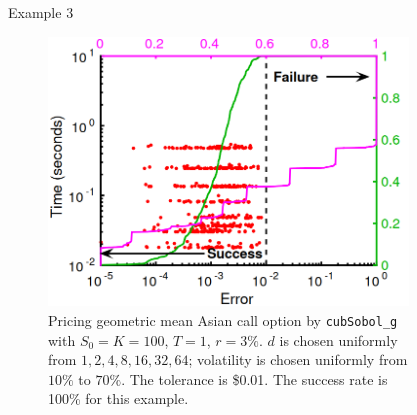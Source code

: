 \documentclass[final]{beamer}
\newlength{\sepwid}
\newlength{\onecolwid}
\newlength{\twocolwid}
\begin{document}
\begin{frame}[t]
\begin{columns}[t]
\begin{column}{\twocolwid}
\begin{column}{\twocolwid}
\begin{columns}[t,totalwidth=\twocolwid]
\begin{column}{\onecolwid}
\end{column} %
\begin{column}{\sepwid}\end{column}
\begin{column}{\onecolwid} %


\begin{block}{\vspace{-11mm}Example 3}

\begin{figure}
	\centering
	\includegraphics[width=1\linewidth]{cubSobol.png}
	\caption[cubSobol]{Pricing geometric mean Asian call option by \texttt{cubSobol\_g} with $S_0=K=100$, $T=1$, $r=3\%$. $d$ is chosen uniformly from $1, 2, 4, 8, 16, 32, 64$; volatility is chosen uniformly from $10\%$ to $70\%$. The tolerance is \$0.01. The success rate is 100\% for this example.}
	\label{fig:cubSobol}
\end{figure}

\end{block}


\end{column} %

\begin{column}{\onecolwid} %
	


\end{column}
\end{columns}
\end{column}
\end{column}
\end{columns}
\end{frame}
\end{document}
